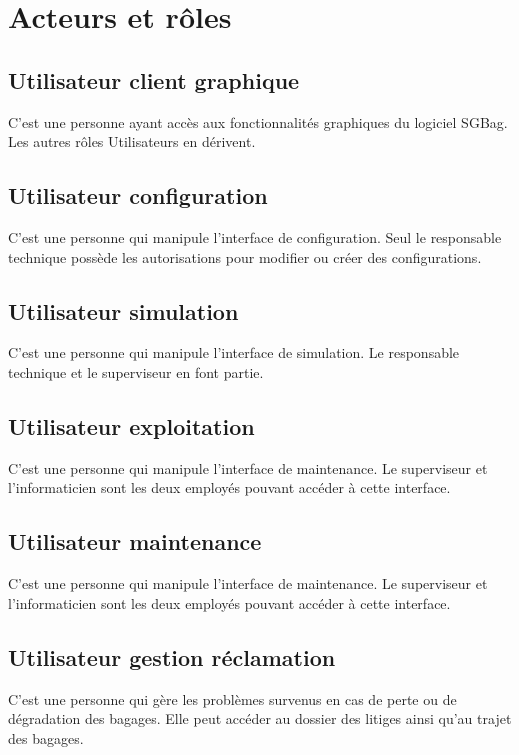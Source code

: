 \section{Acteurs et rôles}
\subsection{Utilisateur client graphique}
C'est une personne ayant accès aux fonctionnalités graphiques du logiciel SGBag. Les autres rôles \og Utilisateurs \fg en dérivent.

\subsection{Utilisateur configuration}
C'est une personne qui manipule l'interface de configuration. Seul le responsable technique possède les autorisations pour modifier ou créer des configurations.

\subsection{Utilisateur simulation}
C'est une personne qui manipule l'interface de simulation. Le responsable technique et le superviseur en font partie.

\subsection{Utilisateur exploitation}
C'est une personne qui manipule l'interface de maintenance. Le superviseur et l'informaticien sont les deux employés pouvant accéder à cette interface.

\subsection{Utilisateur maintenance}
C'est une personne qui manipule l'interface de maintenance. Le superviseur et l'informaticien sont les deux employés pouvant accéder à cette interface.

\subsection{Utilisateur gestion réclamation}
C'est une personne qui gère les problèmes survenus en cas de perte ou de dégradation des bagages. Elle peut accéder au dossier des litiges ainsi qu'au trajet des bagages.

